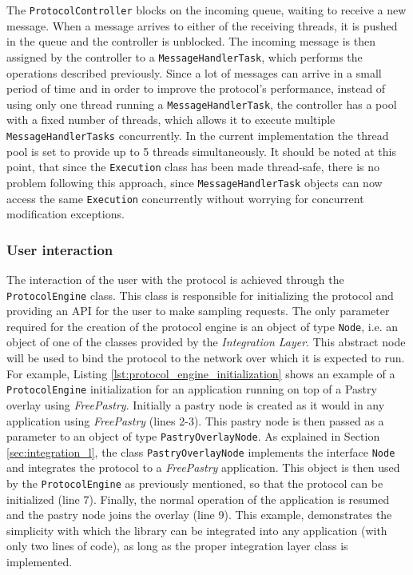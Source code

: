 \documentclass[a4paper,11pt,twoside]{report}
\newcommand{\classname}[1]{\texttt{#1}}
\begin{document}
The \classname{ProtocolController} blocks on the incoming queue, waiting to receive a new message. When a message arrives to either of the receiving threads, it is pushed in the queue and the controller is unblocked. The incoming message is  then assigned by the controller to a \classname{MessageHandlerTask}, which performs the operations described previously. Since a lot of messages can arrive in a small period of time and in order to improve the protocol's performance, instead of using only one thread running a \classname{MessageHandlerTask}, the controller has a pool with a fixed number of threads, which allows it to execute multiple \classname{MessageHandlerTasks} concurrently. In the current implementation the thread pool is set to provide up to 5 threads simultaneously. It should be noted at this point, that since the \classname{Execution} class has been made thread-safe, there is no problem following this approach, since \classname{MessageHandlerTask} objects can now access the same \classname{Execution} concurrently without worrying for concurrent modification exceptions.\\


\subsubsection*{User interaction}

The interaction of the user with the protocol is achieved through the \classname{ProtocolEngine} class. This class is responsible for initializing the protocol and providing an API for the user to make sampling requests. The only parameter required for the creation of the protocol engine is an object of type \classname{Node}, i.e. an object of one of the classes provided by the \textit{Integration Layer}. This abstract node will be used to bind the protocol to the network over which it is expected to run. For example, Listing \ref{lst:protocol_engine_initialization} shows an example of a \classname{ProtocolEngine} initialization for an application running on top of a Pastry overlay using \textit{FreePastry}. Initially a pastry node is created as it would in any application using \textit{FreePastry} (lines 2-3). This pastry node is then passed as a parameter to an object of type \classname{PastryOverlayNode}. As explained in Section \ref{sec:integration_l}, the class \classname{PastryOverlayNode} implements the interface \classname{Node} and integrates the protocol to a \textit{FreePastry} application. This object is then used by the \classname{ProtocolEngine} as previously mentioned, so that the protocol can be initialized (line 7). Finally, the normal operation of the application is resumed and the pastry node joins the overlay (line 9). This example, demonstrates the simplicity with which the library can be integrated into any application (with only two lines of code), as long as the proper integration layer class is implemented.\\
\end{document}
